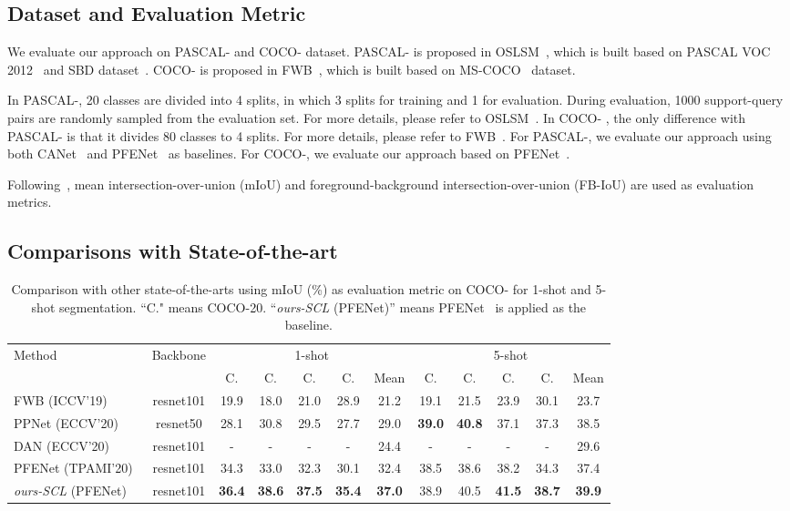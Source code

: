 \documentclass[final]{cvpr}
\begin{document}
\subsection{Dataset and Evaluation Metric}
We evaluate our approach on PASCAL- and COCO- dataset. PASCAL- is proposed in OSLSM~\cite{shaban2017one}, which is built based on PASCAL VOC 2012~\cite{everingham2010pascal} and SBD dataset~\cite{hariharan2014simultaneous}. COCO- is proposed in FWB~\cite{nguyen2019feature}, which is built based on MS-COCO~\cite{lin2014microsoft} dataset. 

In PASCAL-, 20 classes are divided into 4 splits, in which 3 splits for training and 1 for evaluation. During evaluation, 1000 support-query pairs are randomly sampled from the evaluation set. For more details, please refer to OSLSM~\cite{shaban2017one}. In COCO- , the only difference with PASCAL- is that it divides 80 classes to 4 splits. For more details, please refer to FWB~\cite{nguyen2019feature}. For PASCAL-, we evaluate our approach using both CANet~\cite{zhang2019canet} and PFENet~\cite{tian2020prior} as baselines. For COCO-, we evaluate our approach based on PFENet~\cite{tian2020prior}.

Following~\cite{wang2019panet}, mean intersection-over-union (mIoU) and foreground-background intersection-over-union (FB-IoU) are used as evaluation metrics. 


\subsection{Comparisons with State-of-the-art}
\begin{table*}[]
	\centering
	\caption{Comparison with other state-of-the-arts using mIoU (\%) as evaluation metric on COCO- for 1-shot and 5-shot segmentation. ``C." means COCO-20. ``\emph{ours-SCL} (PFENet)'' means PFENet~\cite{tian2020prior} is applied as the baseline.}\label{tab:COCO}
	\begin{tabular}{lcccccc|ccccc}
		\hline
		\multirow{2}{*}{Method} & \multirow{2}{*}{Backbone}& \multicolumn{5}{c|}{1-shot}                          & \multicolumn{5}{c}{5-shot}                           \\ \cline{3-12} 
		&& C. & C. & C. & C. & Mean & C. & C.& C. & C. & Mean \\ \hline
		FWB (ICCV'19)~\cite{nguyen2019feature}&resnet101&19.9&18.0& 21.0&28.9&21.2&19.1&21.5&23.9&30.1&23.7\\
		PPNet (ECCV'20)~\cite{liu2020part}&resnet50&28.1&30.8&29.5&27.7&29.0&\textbf{39.0}&\textbf{40.8}&37.1&37.3&38.5\\
		DAN (ECCV'20)~\cite{wang2020few}&resnet101&-&-&-&-&24.4&-&-&-&-&29.6\\
		PFENet (TPAMI'20)~\cite{tian2020prior}&resnet101 &34.3&33.0&32.3&30.1&32.4&38.5&38.6&38.2&34.3&37.4\\ \hline
		\emph{ours-SCL }(PFENet)&resnet101 &\textbf{36.4}&\textbf{38.6}&\textbf{37.5}&\textbf{35.4}&\textbf{37.0} &38.9&40.5&\textbf{41.5}&\textbf{38.7}& \textbf{39.9}\\ \hline
	\end{tabular}
\end{table*}
\end{document}

